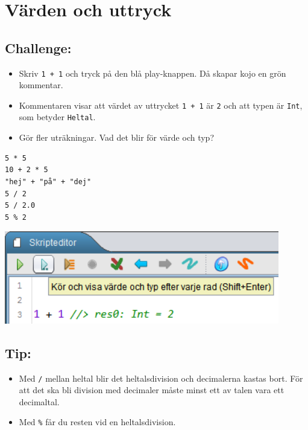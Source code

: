 \chapter{Värden och uttryck}
\begin{multicols}{2}
\section*{\color{BrickRed}Challenge:}


\begin{itemize}

\item {Skriv \lstinline{1 + 1} och tryck på den blå play-knappen. Då skapar kojo en grön kommentar.}
\item {Kommentaren visar att värdet av uttrycket \lstinline{1 + 1} är \lstinline{2} och att typen är \lstinline{Int}, som betyder \lstinline{Heltal}.}
\item {Gör fler uträkningar. Vad det blir för värde och typ?}

\end{itemize}



\begin{lstlisting}[numbers=none]
5 * 5
10 + 2 * 5
"hej" + "på" + "dej"
5 / 2
5 / 2.0
5 % 2
\end{lstlisting}
        


\columnbreak


\includegraphics[width=12.0cm]{../img/show-value.png}
\section*{\color{OliveGreen}Tip:}


\begin{itemize}

\item {Med \lstinline{/} mellan heltal blir det heltalsdivision och decimalerna kastas bort. För att det ska bli division med decimaler måste minst ett av talen vara ett decimaltal.}
\item {Med \lstinline{%} får du resten vid en heltalsdivision.}

\end{itemize}


\end{multicols}

